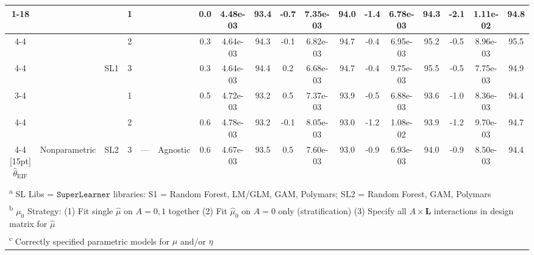 \begin{table}
\begin{tabular}[t]{ccccccc@{}c@{}cc@{}c@{}cc@{}c@{}cc@{}c@{}c}
\cmidrule{1-18}
 &  &  &  1 &  &  & 0.0 & 4.48e-03 & 93.4 & -0.7 & 7.35e-03 & 94.0 & -1.4 & 6.78e-03 & 94.3 & -2.1 & 1.11e-02 & 94.8\\
\cmidrule{4-4}
\cmidrule{7-18}
 &  &  &  2 &  &  & 0.3 & 4.64e-03 & 94.3 & -0.1 & 6.82e-03 & 94.7 & -0.4 & 6.95e-03 & 95.2 & -0.5 & 8.96e-03 & 95.5\\
\cmidrule{4-4}
\cmidrule{7-18}
 &  & \multirow{-3}{*}[5pt]{\centering\arraybackslash SL1} &  3 &  &  & 0.3 & 4.64e-03 & 94.4 & 0.2 & 6.68e-03 & 94.7 & -0.4 & 9.75e-03 & 95.5 & -0.5 & 7.75e-03 & 94.9\\
\cmidrule{3-4}
\cmidrule{7-18}
 &  &  &  1 &  &  & 0.5 & 4.72e-03 & 93.2 & 0.5 & 7.37e-03 & 93.9 & -0.5 & 6.88e-03 & 93.6 & -1.0 & 8.36e-03 & 94.4\\
\cmidrule{4-4}
\cmidrule{7-18}
 &  &  &  2 &  &  & 0.6 & 4.78e-03 & 93.2 & -0.1 & 8.05e-03 & 93.0 & -1.2 & 1.08e-02 & 93.9 & -1.2 & 9.70e-03 & 94.7\\
\cmidrule{4-4}
\cmidrule{7-18}
\multirow{-6}{*}[15pt]{\centering\arraybackslash $\widehat\theta_\text{EIF}$} & \multirow{-6}{*}[15pt]{\centering\arraybackslash  Nonparametric} & \multirow{-3}{*}[5pt]{\centering\arraybackslash SL2} &  3 & \multirow{-6}{*}[15pt]{\centering\arraybackslash  ---} & \multirow{-6}{*}[15pt]{\centering\arraybackslash  Agnostic} & 0.6 & 4.67e-03 & 93.5 & 0.5 & 7.60e-03 & 93.0 & -0.9 & 6.93e-03 & 94.0 & -0.9 & 8.50e-03 & 94.4\\
\bottomrule\\
\multicolumn{18}{l}{\textsuperscript{a} SL Libs = $\texttt{SuperLearner}$ libraries: S1 = {Random Forest, LM/GLM, GAM, Polymars}; SL2 = {Random Forest, GAM, Polymars}}\\
\multicolumn{18}{l}{\textsuperscript{b} $\mu_0$ Strategy: (1) Fit single $\widehat\mu$ on $A = 0,1$ together (2) Fit $\widehat\mu_0$ on $A = 0$ only (stratification) (3) Specify all $A\times\bm L$ interactions in design matrix for $\widehat\mu$}\\
\multicolumn{18}{l}{\textsuperscript{c} Correctly specified parametric models for $\mu$ and/or $\eta$}\\
\end{tabular}
\end{table}


